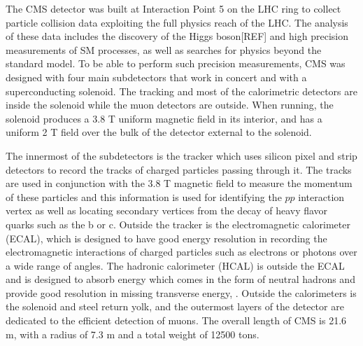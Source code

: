 The CMS detector was built
 at Interaction Point 5 on the LHC ring
 to collect particle collision data  exploiting the full physics reach
 of the LHC.
The analysis of these data includes
 the discovery of the Higgs boson[REF]
 and high precision measurements of SM processes,
 as well as searches for physics beyond the standard model.
To be able to perform such precision measurements,
 CMS was designed with four main subdetectors 
 that work in concert and with a superconducting solenoid.
The tracking and most of the calorimetric
 detectors are inside the solenoid while
 the muon detectors are outside.
When running, the solenoid produces a 3.8 T 
 uniform magnetic field in its interior,
 and has a uniform 2 T field 
 over the bulk of the detector external to the solenoid.

The innermost of the subdetectors is the tracker
 which uses silicon pixel and strip detectors 
 to record the tracks of charged particles 
 passing through it. 
The tracks are used in conjunction with the
 $3.8$ T magnetic field to measure the momentum of these particles
 and
 this information is used for identifying
 the $pp$ interaction vertex %
 as well as locating secondary vertices 
 from the decay of heavy flavor quarks
 such as the b or c.
Outside the tracker is the electromagnetic calorimeter (ECAL), 
 which is designed to have good energy resolution in recording
 the electromagnetic interactions of charged particles
 such as electrons or photons over a wide range of angles.
The hadronic calorimeter (HCAL) is outside the ECAL
 and is designed to absorb energy which
 comes in the form of neutral hadrons and provide 
 good resolution in missing transverse energy, \met.
Outside the calorimeters is the solenoid and steel return yolk,
 and the outermost layers of the detector are dedicated
 to the efficient detection of muons.
The overall length of CMS is 21.6 m, with a radius of 7.3 m
  and a total weight of 12500 tons.

